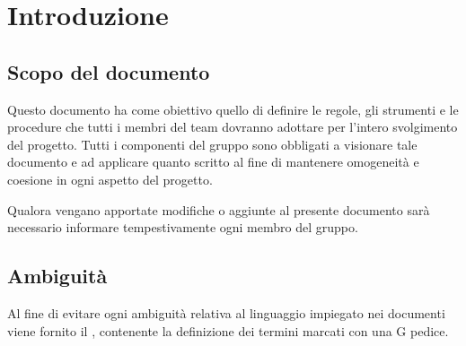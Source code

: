 \section{Introduzione}

\subsection{Scopo del documento}

Questo documento ha come obiettivo quello di definire le regole, gli strumenti e le procedure che tutti i membri del team dovranno adottare per l'intero svolgimento del progetto. Tutti i componenti del gruppo sono obbligati a visionare tale documento e ad applicare quanto scritto al fine di mantenere omogeneità e coesione in ogni aspetto del progetto.

Qualora vengano apportate modifiche o aggiunte al presente documento sarà necessario informare tempestivamente ogni membro del gruppo.

\subsection{Ambiguità}

Al fine di evitare ogni ambiguità relativa al linguaggio impiegato nei documenti viene fornito il \Glossario{}, contenente la definizione dei termini marcati con una G pedice.
